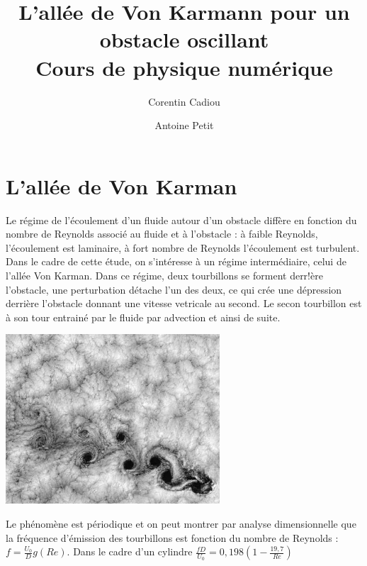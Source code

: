
\title{L'allée de Von Karmann pour un obstacle oscillant\\
Cours de physique numérique}

\author{Corentin Cadiou \and Antoine Petit}
\date{}



\maketitle

\tableofcontents

\section{L'allée de Von Karman}
	
	Le régime de l'écoulement d'un fluide autour d'un obstacle diffère en fonction du nombre de Reynolds associé au fluide et à l'obstacle : à faible Reynolds, l'écoulement est laminaire, à fort nombre de Reynolds l'écoulement est turbulent. Dans le cadre de cette étude, on s'intéresse à un régime intermédiaire, celui de l'allée Von Karman. Dans ce régime, deux tourbillons se forment derr!ère l'obstacle, une perturbation détache l'un des deux, ce qui crée une dépression derrière l'obstacle donnant une vitesse vetricale au second. Le secon tourbillon est à son tour entrainé par le fluide par advection et ainsi de suite.
	
\begin{center}
  \includegraphics[width=0.6\textwidth]{von-karman-clouds.jpg}
\end{center}
  
	Le phénomène est périodique et on peut montrer par analyse dimensionnelle que la fréquence d'émission des tourbillons est fonction du nombre de Reynolds : $f = \frac{U_0}{D}g(Re)$. Dans le cadre d'un cylindre $\frac{fD}{U_0}=0,198\left (1-\frac{19,7}{Re}\right )$ \cite{Von_Karman}
	
